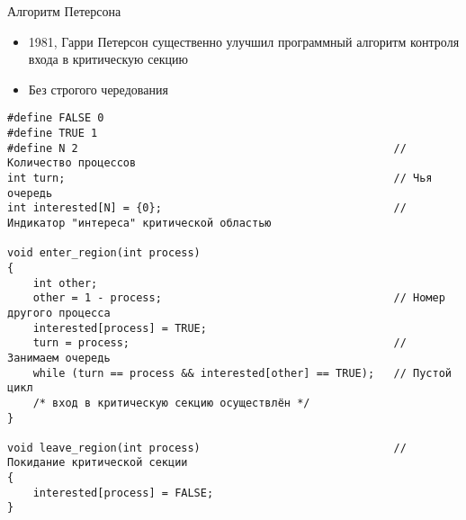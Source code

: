 \documentclass[aspectratio=169,14pt]{beamer}
\begin{document}
\begin{frame}[containsverbatim]{Алгоритм Петерсона}
    \begin{itemize}
        \item 1981, Гарри Петерсон существенно улучшил программный алгоритм
        контроля входа в критическую секцию
        \item Без строгого чередования
    \end{itemize}
    \begin{tiny}
        \begin{verbatim}
#define FALSE 0
#define TRUE 1
#define N 2                                                 // Количество процессов
int turn;                                                   // Чья очередь
int interested[N] = {0};                                    // Индикатор "интереса" критической областью

void enter_region(int process)
{
    int other;
    other = 1 - process;                                    // Номер другого процесса
    interested[process] = TRUE;
    turn = process;                                         // Занимаем очередь
    while (turn == process && interested[other] == TRUE);   // Пустой цикл
    /* вход в критическую секцию осуществлён */
}

void leave_region(int process)                              // Покидание критической секции
{
    interested[process] = FALSE;
}
        \end{verbatim}
        \end{tiny}
\end{frame}
\end{document}
